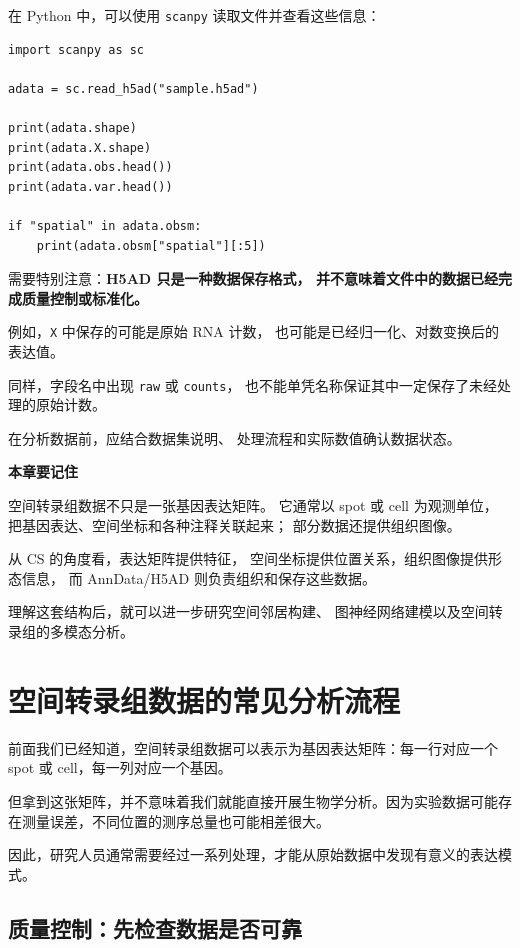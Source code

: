 \documentclass[UTF8,a4paper,11pt,fontset=fandol]{ctexart}
\renewcommand{\arraystretch}{1.3}
\newcommand{\chapterstart}[1]{\clearpage\section{#1}}
\newcommand{\code}[1]{{\color{tealaccent}\texttt{#1}}}
\begin{document}
在 Python 中，可以使用 \code{scanpy} 读取文件并查看这些信息：

\begin{verbatim}
import scanpy as sc

adata = sc.read_h5ad("sample.h5ad")

print(adata.shape)
print(adata.X.shape)
print(adata.obs.head())
print(adata.var.head())

if "spatial" in adata.obsm:
    print(adata.obsm["spatial"][:5])
\end{verbatim}

需要特别注意：\textbf{H5AD 只是一种数据保存格式，
并不意味着文件中的数据已经完成质量控制或标准化。}

例如，\code{X} 中保存的可能是原始 RNA 计数，
也可能是已经归一化、对数变换后的表达值。

同样，字段名中出现 \code{raw} 或 \code{counts}，
也不能单凭名称保证其中一定保存了未经处理的原始计数。

在分析数据前，应结合数据集说明、
处理流程和实际数值确认数据状态。\cite{anndata}

\medskip
\noindent\textbf{本章要记住}

空间转录组数据不只是一张基因表达矩阵。
它通常以 spot 或 cell 为观测单位，
把基因表达、空间坐标和各种注释关联起来；
部分数据还提供组织图像。

从 CS 的角度看，表达矩阵提供特征，
空间坐标提供位置关系，组织图像提供形态信息，
而 AnnData/H5AD 则负责组织和保存这些数据。

理解这套结构后，就可以进一步研究空间邻居构建、
图神经网络建模以及空间转录组的多模态分析。



\chapterstart{空间转录组数据的常见分析流程}

前面我们已经知道，空间转录组数据可以表示为基因表达矩阵：每一行对应一个 spot 或 cell，每一列对应一个基因。

但拿到这张矩阵，并不意味着我们就能直接开展生物学分析。因为实验数据可能存在测量误差，不同位置的测序总量也可能相差很大。

因此，研究人员通常需要经过一系列处理，才能从原始数据中发现有意义的表达模式。

\begingroup
\linespread{1.0}\selectfont
\setlength{\parskip}{.12em}
\renewcommand{\arraystretch}{1.1}

\subsection{质量控制：先检查数据是否可靠}
\end{document}
